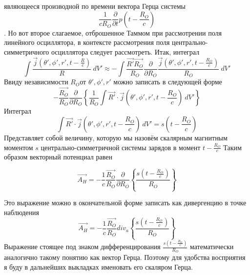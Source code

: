 \documentclass[11pt]{article}
\begin{document}
являющееся производной по времени вектора Герца системы
\begin{equation}\frac{1}{c{{R}_{O}}}\frac{\partial }{\partial t}p\left(
t-\frac{{{R}_{O}}}{c} \right)\end{equation}. Но вот второе слагаемое, отброшенное
Таммом при рассмотрении поля линейного осциллятора, в контексте
рассмотрения поля центрально-симметричного осциллятора следует
рассмотреть. Итак, интеграл
\begin{equation}\int{\frac{\overrightarrow{j}\left( \theta ',\phi ',r',t-\frac{R}{c} \right)}{R}}~dV'\approx -\int{\frac{\overrightarrow{R'}\overrightarrow{{{R}_{O}}}}{{{R}_{O}}}\frac{\partial }{\partial {{R}_{O}}}\frac{\overrightarrow{j}\left( \theta ',\phi ',r',t-\frac{{{R}_{O}}}{c} \right)}{{{R}_{O}}}\ dV'}\end{equation}
Ввиду независимости \({{R}_{O}}\)от \(\theta ',\phi ',r'\) можно
записать в следующей форме
\begin{equation}
-\frac{\overrightarrow{{{R}_{O}}}}{{{R}_{O}}}\frac{\partial }{\partial {{R}_{O}}}\left\{
\frac{1}{{{R}_{O}}}\int{\overrightarrow{R'}\cdot \overrightarrow{j}\left( \theta ',\phi ',r',t-\frac{{{R}_{O}}}{c} \right)}~dV'
\right\}\end{equation}
Интеграл
\begin{equation}
\int{\overrightarrow{R'}\cdot \overrightarrow{j}\left( \theta ',\phi ',r',t-\frac{{{R}_{O}}}{c} \right)}~dV'
=s\left(t-\frac{{{R}_{O}}}{c} \right)
\end{equation} Представляет собой величину, которую мы
назовём скалярным магнитным моментом \(s\) центрально-симметричной системы
зарядов в момент \(t-\frac{{{R}_{O}}}{c}\) Таким образом векторный
потенциал равен

\begin{equation}\overrightarrow{{{A}_{H}}}=-\frac{1}{c}\frac{\overrightarrow{{{R}_{O}}}}{{{R}_{O}}}\frac{\partial }{\partial {{R}_{O}}}\left\{
\frac{s\left( t-\frac{{{R}_{O}}}{c} \right)}{{{R}_{O}}} \right\}
\end{equation}

Это выражение можно в окончательной форме записать как дивергенцию в точке
наблюдения
\begin{equation}
\overrightarrow{{A}_{H}}=-\frac{1}{c}\frac{\overrightarrow{{R}_{O}}}{{R}_{O}}
di{{v}}_{a}\left\{
\frac{s\left( t-\frac{{{R}_{O}}}{c} \right)}{{R}_{O}}
\right\}
\end{equation}
Выражение стоящее под знаком дифференцирования
\(\frac{s\left( t-\frac{{{R}_{O}}}{c} \right)}{{{R}_{O}}}\) математически
аналогично такому понятию как вектор Герца. Поэтому для удобства
восприятия я буду в дальнейших выкладках именовать его скаляром Герца.
\end{document}
